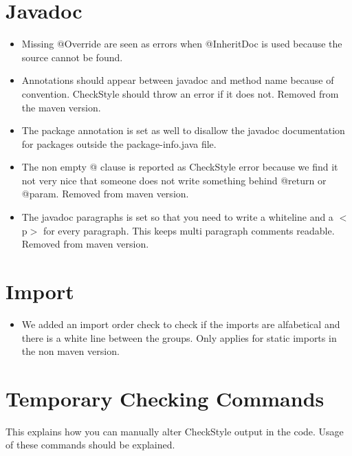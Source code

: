\documentclass[11pt,a4paper]{report}
\begin{document}
\section{Javadoc}

\begin{itemize}

\item Missing @Override are seen as errors when @InheritDoc is used because the source cannot be found.

\item Annotations should appear between javadoc and method name because of convention. CheckStyle should throw an error if it does not. Removed from the maven version.

\item The package annotation is set as well to disallow the javadoc documentation for packages outside the package-info.java file.

\item The non empty @ clause is reported as CheckStyle error because we find it not very nice that someone does not write something behind @return or @param. Removed from maven version.

\item The javadoc paragraphs is set so that you need to write a whiteline and a $<$p$>$ for every paragraph. This keeps multi paragraph comments readable. Removed from maven version.

\end{itemize}

\section{Import}

\begin{itemize}

\item We added an import order check to check if the imports are alfabetical and there is a white line between the groups. Only applies for static imports in the non maven version.

\end{itemize}

\section{Temporary Checking Commands}

This explains how you can manually alter CheckStyle output in the code. Usage of these commands should be explained.
\end{document}
